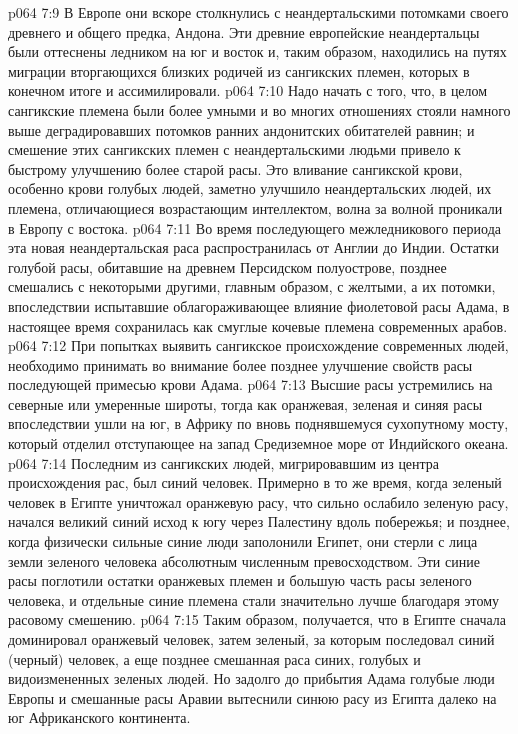\vs p064 7:9 В Европе они вскоре столкнулись с неандертальскими потомками своего древнего и общего предка, Андона. Эти древние европейские неандертальцы были оттеснены ледником на юг и восток и, таким образом, находились на путях миграции вторгающихся близких родичей из сангикских племен, которых в конечном итоге и ассимилировали.
\vs p064 7:10 Надо начать с того, что, в целом сангикские племена были более умными и во многих отношениях стояли намного выше деградировавших потомков ранних андонитских обитателей равнин; и смешение этих сангикских племен с неандертальскими людьми привело к быстрому улучшению более старой расы. Это вливание сангикской крови, особенно крови голубых людей, заметно улучшило неандертальских людей, их племена, отличающиеся возрастающим интеллектом, волна за волной проникали в Европу с востока.
\vs p064 7:11 Во время последующего межледникового периода эта новая неандертальская раса распространилась от Англии до Индии. Остатки голубой расы, обитавшие на древнем Персидском полуострове, позднее смешались с некоторыми другими, главным образом, с желтыми, а их потомки, впоследствии испытавшие облагораживающее влияние фиолетовой расы Адама, в настоящее время сохранилась как смуглые кочевые племена современных арабов.
\vs p064 7:12 \pc При попытках выявить сангикское происхождение современных людей, необходимо принимать во внимание более позднее улучшение свойств расы последующей примесью крови Адама.
\vs p064 7:13 \pc Высшие расы устремились на северные или умеренные широты, тогда как оранжевая, зеленая и синяя расы впоследствии ушли на юг, в Африку по вновь поднявшемуся сухопутному мосту, который отделил отступающее на запад Средиземное море от Индийского океана.
\vs p064 7:14 Последним из сангикских людей, мигрировавшим из центра происхождения рас, был синий человек. Примерно в то же время, когда зеленый человек в Египте уничтожал оранжевую расу, что сильно ослабило зеленую расу, начался великий синий исход к югу через Палестину вдоль побережья; и позднее, когда физически сильные синие люди заполонили Египет, они стерли с лица земли зеленого человека абсолютным численным превосходством. Эти синие расы поглотили остатки оранжевых племен и большую часть расы зеленого человека, и отдельные синие племена стали значительно лучше благодаря этому расовому смешению.
\vs p064 7:15 Таким образом, получается, что в Египте сначала доминировал оранжевый человек, затем зеленый, за которым последовал синий (черный) человек, а еще позднее смешанная раса синих, голубых и видоизмененных зеленых людей. Но задолго до прибытия Адама голубые люди Европы и смешанные расы Аравии вытеснили синюю расу из Египта далеко на юг Африканского континента.
